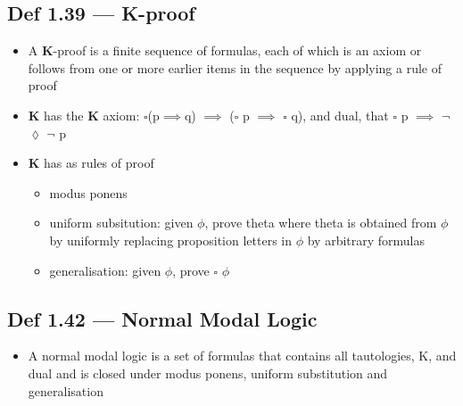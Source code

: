 \documentclass[10pt, a4paper, twoside]{article}
\begin{document}
\subsection{Def 1.39 --- {\bf K}-proof}
\begin{itemize}
  \item A {\bf K}-proof is a finite sequence of formulas, each of which is an axiom or
  follows from one or more earlier items in the sequence by applying a rule of
  proof
  \item {\bf K} has the {\bf K} axiom: $\square$(p$\implies$q) $\implies$ ($\square$ p $\implies$ $\square$ q), and dual, that $\square$ p
  $\implies$ $\neg$ $\lozenge$ $\neg$ p
  \item {\bf K} has as rules of proof
  \begin{itemize}
    \item modus ponens
    \item uniform subsitution: given $\phi$, prove theta where theta is obtained from $\phi$ by uniformly replacing proposition letters in $\phi$ by arbitrary formulas
    \item generalisation: given $\phi$, prove $\square$ $\phi$
  \end{itemize}
\end{itemize}
\subsection{ Def 1.42 --- Normal Modal Logic}
\begin{itemize}
  \item A normal modal logic is a set of formulas that contains all tautologies,
  K, and dual and is closed under modus ponens, uniform substitution and
  generalisation
\end{itemize}

\end{document}

